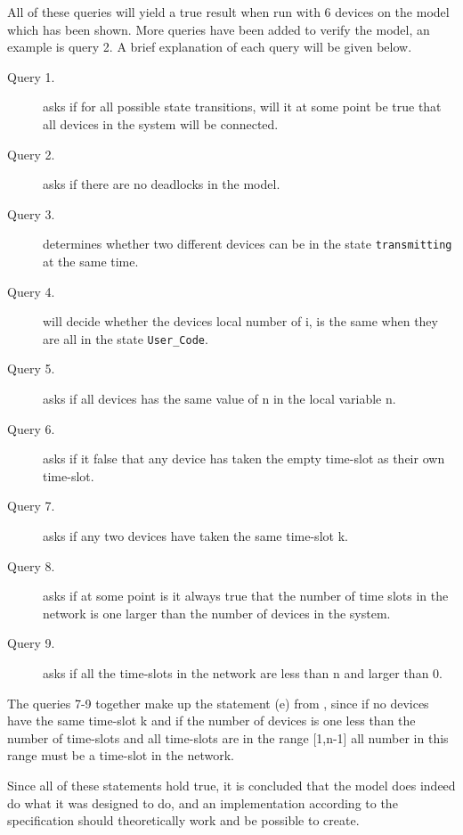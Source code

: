 All of these queries will yield a true result when run with 6 devices on the model which has been shown.
More queries have been added to verify the model, an example is query 2.
A brief explanation of each query will be given below. 

\begin{description}
	\item [Query 1.] asks if for all possible state transitions, will it at some point be true that all devices in the system will be connected.
	\item [Query 2.] asks if there are no deadlocks in the model.
	\item [Query 3.] determines whether two different devices can be in the state \texttt{transmitting} at the same time.
	\item [Query 4.] will decide whether the devices local number of i, is the same when they are all in the state \texttt{User_Code}.
	\item [Query 5.] asks if all devices has the same value of n in the local variable n.
	\item [Query 6.] asks if it false that any device has taken the empty time-slot as their own time-slot.
	\item [Query 7.] asks if any two devices have taken the same time-slot k.
	\item [Query 8.] asks if at some point is it always true that the number of time slots in the network is one larger than the number of devices in the system.
	\item [Query 9.] asks if all the time-slots in the network are less than n and larger than 0.
\end{description}
The queries 7-9 together make up the statement (e) from , since if no devices have the same time-slot k and if the number of devices is one less than the number of time-slots and all time-slots are in the range [1,n-1] all number in this range must be a time-slot in the network.

Since all of these statements hold true, it is concluded that the model does indeed do what it was designed to do, and an implementation according to the specification should theoretically work and be possible to create.